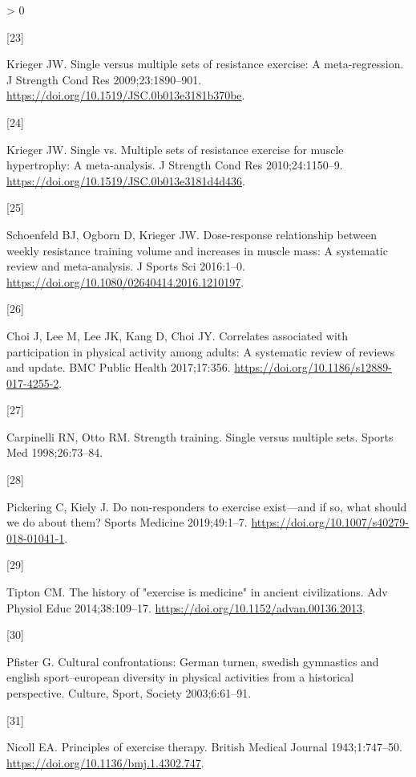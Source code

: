\documentclass[twoside,10pt]{gihclass} %
\newlength{\cslhangindent}
\newlength{\csllabelwidth}
\newenvironment{CSLReferences}[3] %
 {%
  \setlength{\parindent}{0pt}
  \ifodd #1 \everypar{\setlength{\hangindent}{\cslhangindent}}\ignorespaces\fi
  \ifnum #2 > 0
  \setlength{\parskip}{#2\baselineskip}
  \fi
 }%
 {}
\newcommand{\CSLLeftMargin}[1]{\parbox[t]{\maxof{\widthof{#1}}{\csllabelwidth}}{#1}}
\newcommand{\CSLRightInline}[1]{\parbox[t]{\linewidth}{#1}}
\begin{document}
\begin{CSLReferences}{0}{0}
\leavevmode\hypertarget{ref-RN793}{}%
\CSLLeftMargin{{[}23{]} }
\CSLRightInline{Krieger JW. Single versus multiple sets of resistance exercise: A meta-regression. J Strength Cond Res 2009;23:1890--901. \url{https://doi.org/10.1519/JSC.0b013e3181b370be}.}

\leavevmode\hypertarget{ref-RN789}{}%
\CSLLeftMargin{{[}24{]} }
\CSLRightInline{Krieger JW. Single vs. Multiple sets of resistance exercise for muscle hypertrophy: A meta-analysis. J Strength Cond Res 2010;24:1150--9. \url{https://doi.org/10.1519/JSC.0b013e3181d4d436}.}

\leavevmode\hypertarget{ref-RN1767}{}%
\CSLLeftMargin{{[}25{]} }
\CSLRightInline{Schoenfeld BJ, Ogborn D, Krieger JW. Dose-response relationship between weekly resistance training volume and increases in muscle mass: A systematic review and meta-analysis. J Sports Sci 2016:1--0. \url{https://doi.org/10.1080/02640414.2016.1210197}.}

\leavevmode\hypertarget{ref-RN2063}{}%
\CSLLeftMargin{{[}26{]} }
\CSLRightInline{Choi J, Lee M, Lee JK, Kang D, Choi JY. Correlates associated with participation in physical activity among adults: A systematic review of reviews and update. BMC Public Health 2017;17:356. \url{https://doi.org/10.1186/s12889-017-4255-2}.}

\leavevmode\hypertarget{ref-RN794}{}%
\CSLLeftMargin{{[}27{]} }
\CSLRightInline{Carpinelli RN, Otto RM. Strength training. Single versus multiple sets. Sports Med 1998;26:73--84.}

\leavevmode\hypertarget{ref-RN2547}{}%
\CSLLeftMargin{{[}28{]} }
\CSLRightInline{Pickering C, Kiely J. Do non-responders to exercise exist---and if so, what should we do about them? Sports Medicine 2019;49:1--7. \url{https://doi.org/10.1007/s40279-018-01041-1}.}

\leavevmode\hypertarget{ref-RN2640}{}%
\CSLLeftMargin{{[}29{]} }
\CSLRightInline{Tipton CM. The history of "exercise is medicine" in ancient civilizations. Adv Physiol Educ 2014;38:109--17. \url{https://doi.org/10.1152/advan.00136.2013}.}

\leavevmode\hypertarget{ref-RN2663}{}%
\CSLLeftMargin{{[}30{]} }
\CSLRightInline{Pfister G. Cultural confrontations: German turnen, swedish gymnastics and english sport--european diversity in physical activities from a historical perspective. Culture, Sport, Society 2003;6:61--91.}

\leavevmode\hypertarget{ref-RN2634}{}%
\CSLLeftMargin{{[}31{]} }
\CSLRightInline{Nicoll EA. Principles of exercise therapy. British Medical Journal 1943;1:747--50. \url{https://doi.org/10.1136/bmj.1.4302.747}.}


\end{CSLReferences}
\end{document}
